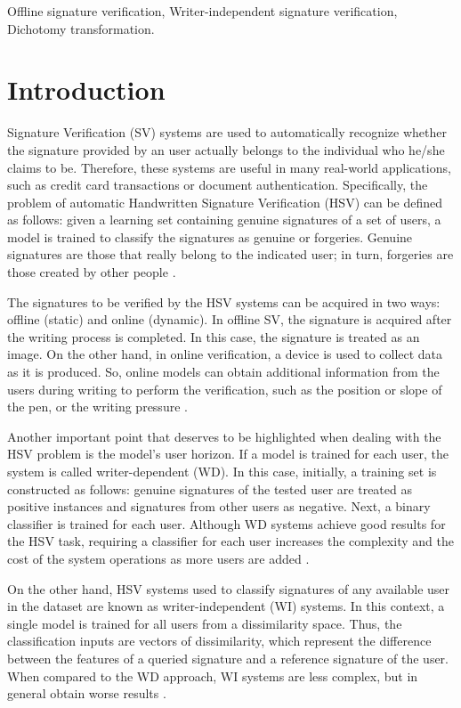 \documentclass[conference]{IEEEtran}
\begin{document}
\begin{IEEEkeywords}
Offline signature verification, Writer-independent signature verification, Dichotomy transformation.
\end{IEEEkeywords}


\section{Introduction}


Signature Verification (SV) systems are used to automatically recognize whether the signature provided by an user actually belongs to the individual who he/she claims to be. Therefore, these systems are useful in many real-world applications, such as credit card transactions or document authentication. Specifically, the problem of automatic Handwritten Signature Verification (HSV) can be defined as follows: given a learning set containing genuine signatures of a set of users, a model is trained to classify the signatures as genuine or forgeries. Genuine signatures are those that really belong to the indicated user; in turn, forgeries are those created by other people \cite{hafemann_review:17}.


The signatures to be verified by the HSV systems can be acquired in two ways: offline (static) and online (dynamic). In offline SV, the signature is acquired after the writing process is completed. In this case, the signature is treated as an image. On the other hand, in online verification, a device is used to collect data as it is produced. So, online models can obtain additional information from the users during writing to perform the verification, such as the position or slope of the pen, or the writing pressure \cite{hafemann_review:17}.


Another important point that deserves to be highlighted when dealing with the HSV problem is the model's user horizon. If a model is trained for each user, the system is called writer-dependent (WD). In this case, initially, a training set is constructed as follows: genuine signatures of the tested user are treated as positive instances and signatures from other users as negative. Next, a binary classifier is trained for each user. Although WD systems achieve good results for the HSV task, requiring a classifier for each user increases the complexity and the cost of the system operations as more users are added \cite{kumar:16}.


On the other hand, HSV systems used to classify signatures of any available user in the dataset are known as writer-independent (WI) systems. In this context, a single model is trained for all users from a dissimilarity space. Thus, the classification inputs are vectors of dissimilarity, which represent the difference between the features of a queried signature and a reference signature of the user. When compared to the WD approach, WI systems are less complex, but in general obtain worse results \cite{hafemann:17}.
\end{document}
